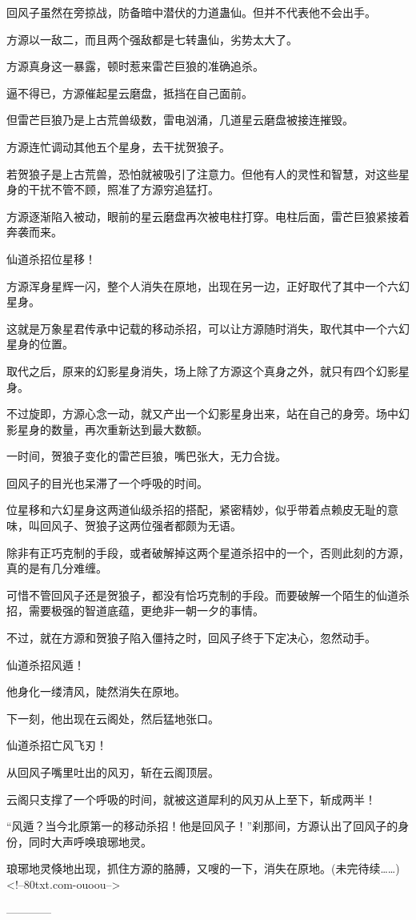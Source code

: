 \begin{this_body}
回风子虽然在旁掠战，防备暗中潜伏的力道蛊仙。但并不代表他不会出手。

方源以一敌二，而且两个强敌都是七转蛊仙，劣势太大了。

方源真身这一暴露，顿时惹来雷芒巨狼的准确追杀。

逼不得已，方源催起星云磨盘，抵挡在自己面前。

但雷芒巨狼乃是上古荒兽级数，雷电汹涌，几道星云磨盘被接连摧毁。

方源连忙调动其他五个星身，去干扰贺狼子。

若贺狼子是上古荒兽，恐怕就被吸引了注意力。但他有人的灵性和智慧，对这些星身的干扰不管不顾，照准了方源穷追猛打。

方源逐渐陷入被动，眼前的星云磨盘再次被电柱打穿。电柱后面，雷芒巨狼紧接着奔袭而来。

仙道杀招位星移！

方源浑身星辉一闪，整个人消失在原地，出现在另一边，正好取代了其中一个六幻星身。

这就是万象星君传承中记载的移动杀招，可以让方源随时消失，取代其中一个六幻星身的位置。

取代之后，原来的幻影星身消失，场上除了方源这个真身之外，就只有四个幻影星身。

不过旋即，方源心念一动，就又产出一个幻影星身出来，站在自己的身旁。场中幻影星身的数量，再次重新达到最大数额。

一时间，贺狼子变化的雷芒巨狼，嘴巴张大，无力合拢。

回风子的目光也呆滞了一个呼吸的时间。

位星移和六幻星身这两道仙级杀招的搭配，紧密精妙，似乎带着点赖皮无耻的意味，叫回风子、贺狼子这两位强者都颇为无语。

除非有正巧克制的手段，或者破解掉这两个星道杀招中的一个，否则此刻的方源，真的是有几分难缠。

可惜不管回风子还是贺狼子，都没有恰巧克制的手段。而要破解一个陌生的仙道杀招，需要极强的智道底蕴，更绝非一朝一夕的事情。

不过，就在方源和贺狼子陷入僵持之时，回风子终于下定决心，忽然动手。

仙道杀招风遁！

他身化一缕清风，陡然消失在原地。

下一刻，他出现在云阁处，然后猛地张口。

仙道杀招亡风飞刃！

从回风子嘴里吐出的风刃，斩在云阁顶层。

云阁只支撑了一个呼吸的时间，就被这道犀利的风刃从上至下，斩成两半！

“风遁？当今北原第一的移动杀招！他是回风子！”刹那间，方源认出了回风子的身份，同时大声呼唤琅琊地灵。

琅琊地灵倏地出现，抓住方源的胳膊，又嗖的一下，消失在原地。(未完待续……)<!--80txt.com-ouoou-->

------------

\end{this_body}

